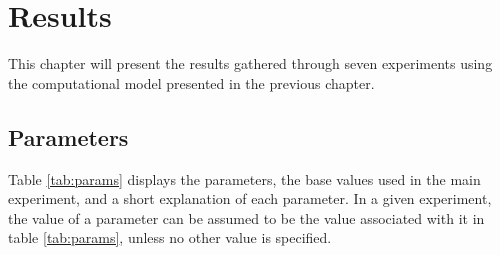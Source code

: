 \acresetall
\chapter{Results}\label{ch:Results}

This chapter will present the results gathered through seven experiments using the computational model presented in the previous chapter.

\section{Parameters}
Table \ref{tab:params} displays the parameters, the base values used in the main experiment, and a short explanation of each parameter. In a given experiment, the value of a parameter can be assumed to be the value associated with it in table \ref{tab:params}, unless no other value is specified.    

